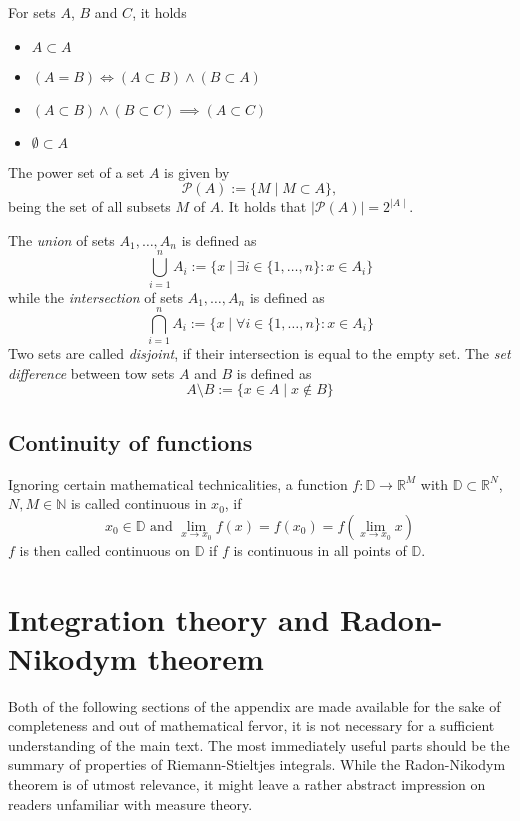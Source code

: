 \documentclass[12pt]{article}
\begin{document}
For sets $A$, $B$ and $C$, it holds
\begin{itemize}
\item $A \subset A$
\item $(A = B) \iff (A \subset B)\land (B \subset A)$
\item $(A \subset B) \land (B \subset C) \implies (A \subset C)$
\item $\emptyset \subset A$
\end{itemize}
The power set of a set $A$ is given by 
\[
\mathcal{P}(A) := \{M \mid M \subset A\},
\]
being the set of all subsets $M$ of $A$.
It holds that $\mid \mathcal{P}(A)\mid = 2^{ \mid A\mid}$.

The \textit{union} of sets $A_1, \dots , A_n$ is defined as
\[
\bigcup\limits_{i = 1}^{n} A_i := \{x \mid \exists i \in \{1, \dots , n\} : x \in A_i\}
\]
while the \textit{intersection} of sets $A_1, \dots , A_n$ is defined as
\[
\bigcap\limits_{i = 1}^{n} A_i := \{x \mid \forall i \in \{1, \dots , n\} : x \in A_i\}
\]
Two sets are called \textit{disjoint}, if their intersection is equal to the empty set.
The \textit{set difference} between tow sets $A$ and $B$ is defined as 
\[
A\setminus B := \{x \in A \mid x \notin B\}
\]

\subsection{Continuity of functions}
Ignoring certain mathematical technicalities, a function $f : \mathbb{D} \to \mathbb{R}^M$ with $\mathbb{D} \subset \mathbb{R}^N$, $N, M \in \mathbb{N}$ is called continuous in $x_0$, if
\[
x_0 \in \mathbb{D} \text{ and } \lim_{x \to x_0} f(x) = f(x_0) = f(\lim_{x \to x_0} x)
\]
$f$ is then called continuous on $\mathbb{D}$ if $f$ is continuous in all points of $\mathbb{D}$.

\section{Integration theory and Radon-Nikodym theorem}
Both of the following sections of the appendix are made available for the sake of completeness and out of mathematical fervor, it is not necessary for a sufficient understanding of the main text. The most immediately useful parts should be the summary of properties of Riemann-Stieltjes integrals. While the Radon-Nikodym theorem is of utmost relevance, it might leave a rather abstract impression on readers unfamiliar with measure theory.
\end{document}
